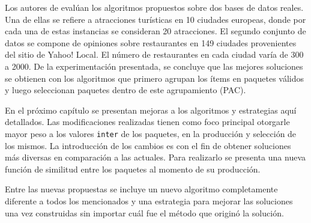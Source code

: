 Los autores de \cite{journals/tkde/Amer-YahiaBCFMZ14} evalúan los algoritmos propuestos sobre dos bases de datos reales. Una de ellas se refiere a atracciones turísticas en 10 ciudades europeas, donde por cada una de estas instancias se consideran 20 atracciones. El segundo conjunto de datos se compone de opiniones sobre restaurantes en 149 ciudades provenientes del sitio de Yahoo! Local. El número de restaurantes en cada ciudad varía de 300 a 2000. De la experimentación presentada, se concluye que las mejores soluciones se obtienen con los algoritmos que primero agrupan los ítems en paquetes válidos y luego seleccionan paquetes dentro de este agrupamiento (PAC).

En el próximo capítulo se presentan mejoras a los algoritmos y estrategias aquí detallados. Las modificaciones realizadas tienen como foco principal otorgarle mayor peso a los valores \texttt{inter} de los paquetes, en la producción y selección de los mismos. La introducción de los cambios es con el fin de obtener soluciones más diversas en comparación a las actuales. Para realizarlo se presenta una nueva función de similitud entre los paquetes al momento de su producción. 

Entre las nuevas propuestas se incluye un nuevo algoritmo completamente diferente a todos los mencionados y una estrategia para mejorar las soluciones una vez construidas sin importar cuál fue el método que originó la solución.
